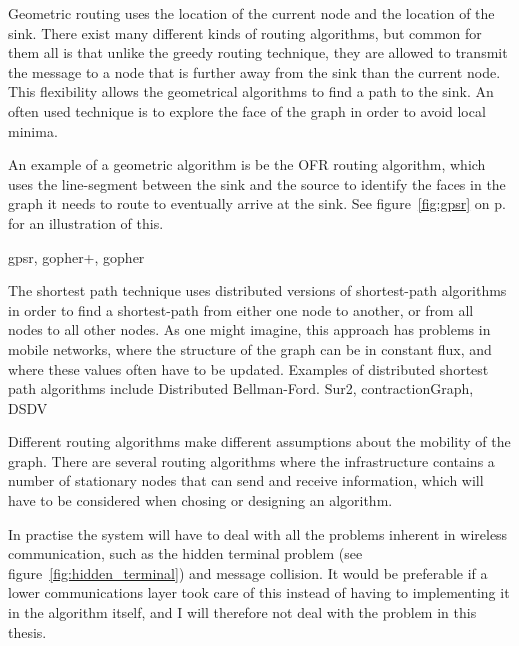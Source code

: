 \begin{description}
{Geometric routing uses the location of the current node and the location of the sink. There exist many different kinds of routing algorithms, but common for them all is that unlike the greedy routing technique, they are allowed to transmit the message to a node that is further away from the sink than the current node. This flexibility allows the geometrical algorithms to find a path to the sink. An often used technique is to explore the face of the graph in order to avoid local minima.

An example of a geometric algorithm is be the OFR \cite{gopher} routing algorithm, which uses the line-segment between the sink and the source to identify the faces in the graph it needs to route to eventually arrive at the sink. See figure~\ref{fig:gpsr} on p. \pageref{fig:gpsr} for an illustration of this.}
{gpsr, gopher+, gopher}

      {The shortest path technique uses distributed versions of shortest-path algorithms in order to find a shortest-path from either one node to another, or from all nodes to all other nodes. As one might imagine, this approach has problems in mobile networks, where the structure of the graph can be in constant flux, and where these values often have to be updated. Examples of distributed shortest path algorithms include Distributed Bellman-Ford.}
{Sur2, contractionGraph, DSDV}
\end{description}

Different routing algorithms make different assumptions about the mobility of the graph. There are several routing algorithms \cite{adaptive, two-tier} where the infrastructure contains a number of stationary nodes that can send and receive information, which will have to be considered when chosing or designing an algorithm.


In practise the system will have to deal with all the problems inherent in wireless communication, such as the hidden terminal problem (see figure~\ref{fig:hidden_terminal}) and message collision. It would be preferable if a lower communications layer took care of this instead of having to implementing it in the algorithm itself, and I will therefore not deal with the problem in this thesis.

